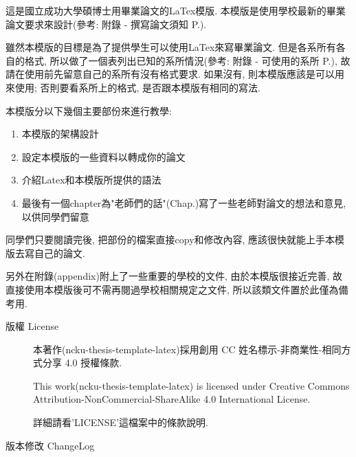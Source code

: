 
這是國立成功大學碩博士用畢業論文的LaTex模版. 本模版是使用學校最新的畢業論文要求來設計(參考: 附錄 - 撰寫論文須知 P.).

雖然本模版的目標是為了提供學生可以使用LaTex來寫畢業論文. 但是各系所有各自的格式, 所以做了一個表列出已知的系所情況(參考: 附錄 - 可使用的系所 P.), 故請在使用前先留意自己的系所有沒有格式要求. 如果沒有, 則本模版應該是可以用來使用; 否則要看系所上的格式, 是否跟本模版有相同的寫法.

本模版分以下幾個主要部份來進行教學:
\begin{enumerate}
  \item 本模版的架構設計
  \item 設定本模版的一些資料以轉成你的論文
  \item 介紹Latex和本模版所提供的語法
  \item 最後有一個chapter為"老師們的話"(Chap.)寫了一些老師對論文的想法和意見, 以供同學們留意
\end{enumerate}
同學們只要閱讀完後, 把部份的檔案直接copy和修改內容, 應該很快就能上手本模版去寫自己的論文.

另外在附錄(appendix)附上了一些重要的學校的文件, 由於本模版很接近完善, 故直接使用本模版後可不需再閱過學校相關規定之文件, 所以該類文件置於此僅為備考用.

\newpage

\begin{description}
  \item[版權 License] \hfill

    本著作(ncku-thesis-template-latex)採用創用 CC 姓名標示-非商業性-相同方式分享 4.0 授權條款.

    This work(ncku-thesis-template-latex) is licensed under Creative Commons Attribution-NonCommercial-ShareAlike 4.0 International License.

  詳細請看'LICENSE'這檔案中的條款說明.

  \item[版本修改 ChangeLog] \hfill
    
\end{description}

\EndChapter
